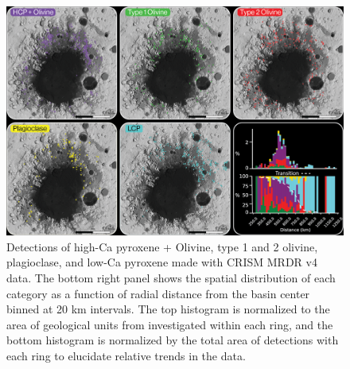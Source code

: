 \documentclass[12pt]{article}
\begin{document}
\begin{figure}
    \centering
    \includegraphics[width=\textwidth]
    {figures/02_Argyre_Minerals_Context_v2.png}
    \caption{Detections of high-Ca pyroxene + Olivine, type 1 and 2 olivine, plagioclase, and low-Ca pyroxene made with CRISM MRDR v4 data. The bottom right panel shows the spatial distribution of each category as a function of radial distance from the basin center binned at 20 km intervals. The top histogram is normalized to the area of geological units from \citet{Dohm2015} investigated within each ring, and the bottom histogram is normalized by the total area of detections with each ring to elucidate relative trends in the data.}
    \label{fig:detections}
\end{figure}
\end{document}
